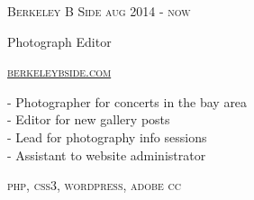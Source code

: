 {
    \textsc{\small{Berkeley B Side
            \hfill
            {\raggedleft
                aug 2014 - now
            }
        }
    }

    {\raggedright\large {
        Photograph Editor
    } \\}

    \textsc{\small\href{http://www.berkeleybside.com}{berkeleybside.com}}

    \normalsize{
        - Photographer for concerts in the bay area\\
        - Editor for new gallery posts \\
        - Lead for photography info sessions\\
        - Assistant to website administrator
    }

    \textsc{\small{\color{highlight}
        php,
        css3,
        wordpress,
        adobe cc
    }}
}
